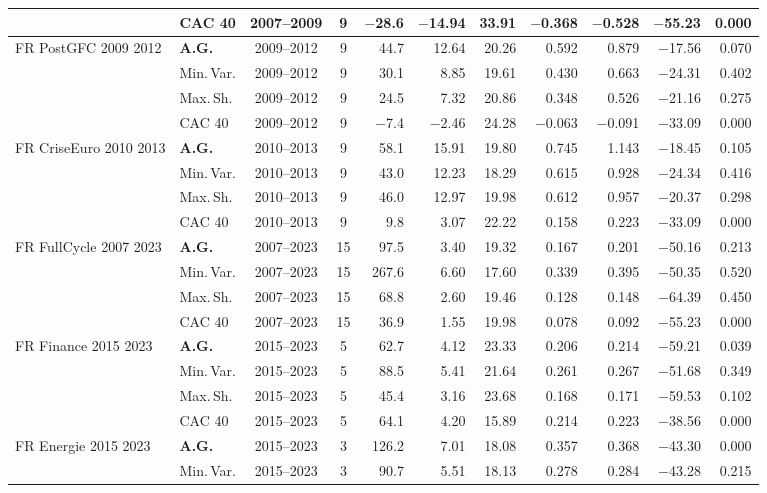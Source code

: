 \begin{longtable}{p{2.6cm} l c c r r r r r r r}
 & CAC 40 & 2007--2009 & 9 & $-$28.6 & $-$14.94 & 33.91 & $-$0.368 & $-$0.528 & $-$55.23 & 0.000 \\
\midrule
FR PostGFC 2009 2012 & \textbf{A.G.} & 2009--2012 & 9 & 44.7 & 12.64 & 20.26 & 0.592 & 0.879 & $-$17.56 & 0.070 \\
 & Min.\,Var. & 2009--2012 & 9 & 30.1 & 8.85 & 19.61 & 0.430 & 0.663 & $-$24.31 & 0.402 \\
 & Max.\,Sh. & 2009--2012 & 9 & 24.5 & 7.32 & 20.86 & 0.348 & 0.526 & $-$21.16 & 0.275 \\
 & CAC 40 & 2009--2012 & 9 & $-$7.4 & $-$2.46 & 24.28 & $-$0.063 & $-$0.091 & $-$33.09 & 0.000 \\
\midrule
FR CriseEuro 2010 2013 & \textbf{A.G.} & 2010--2013 & 9 & 58.1 & 15.91 & 19.80 & 0.745 & 1.143 & $-$18.45 & 0.105 \\
 & Min.\,Var. & 2010--2013 & 9 & 43.0 & 12.23 & 18.29 & 0.615 & 0.928 & $-$24.34 & 0.416 \\
 & Max.\,Sh. & 2010--2013 & 9 & 46.0 & 12.97 & 19.98 & 0.612 & 0.957 & $-$20.37 & 0.298 \\
 & CAC 40 & 2010--2013 & 9 & 9.8 & 3.07 & 22.22 & 0.158 & 0.223 & $-$33.09 & 0.000 \\
\midrule
FR FullCycle 2007 2023 & \textbf{A.G.} & 2007--2023 & 15 & 97.5 & 3.40 & 19.32 & 0.167 & 0.201 & $-$50.16 & 0.213 \\
 & Min.\,Var. & 2007--2023 & 15 & 267.6 & 6.60 & 17.60 & 0.339 & 0.395 & $-$50.35 & 0.520 \\
 & Max.\,Sh. & 2007--2023 & 15 & 68.8 & 2.60 & 19.46 & 0.128 & 0.148 & $-$64.39 & 0.450 \\
 & CAC 40 & 2007--2023 & 15 & 36.9 & 1.55 & 19.98 & 0.078 & 0.092 & $-$55.23 & 0.000 \\
\midrule
FR Finance 2015 2023 & \textbf{A.G.} & 2015--2023 & 5 & 62.7 & 4.12 & 23.33 & 0.206 & 0.214 & $-$59.21 & 0.039 \\
 & Min.\,Var. & 2015--2023 & 5 & 88.5 & 5.41 & 21.64 & 0.261 & 0.267 & $-$51.68 & 0.349 \\
 & Max.\,Sh. & 2015--2023 & 5 & 45.4 & 3.16 & 23.68 & 0.168 & 0.171 & $-$59.53 & 0.102 \\
 & CAC 40 & 2015--2023 & 5 & 64.1 & 4.20 & 15.89 & 0.214 & 0.223 & $-$38.56 & 0.000 \\
\midrule
FR Energie 2015 2023 & \textbf{A.G.} & 2015--2023 & 3 & 126.2 & 7.01 & 18.08 & 0.357 & 0.368 & $-$43.30 & 0.000 \\
 & Min.\,Var. & 2015--2023 & 3 & 90.7 & 5.51 & 18.13 & 0.278 & 0.284 & $-$43.28 & 0.215 \\

\end{longtable}
